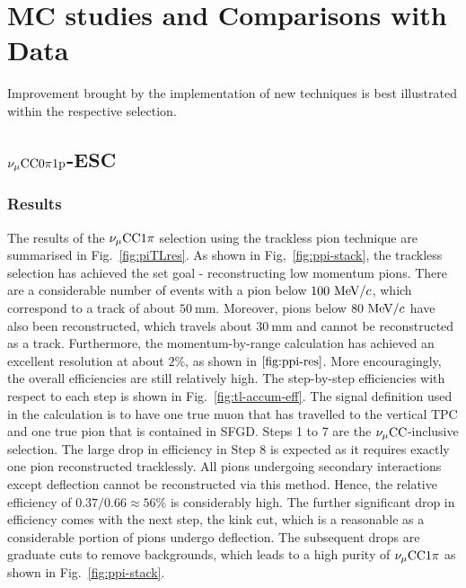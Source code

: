 \section{MC studies and Comparisons with Data}
     Improvement brought by the implementation of new techniques is best illustrated within the respective selection.

     \subsection{$\nu_{\mu}\textrm{CC}0\pi1\textrm{p}$-ESC}
    
        \subsubsection{Results}
           The results of the $\nu_{\mu}\textrm{CC}1\pi$ selection using the trackless pion technique are summarised in Fig.~\ref{fig:piTLres}.
           As shown in Fig,~\ref{fig:ppi-stack}, the trackless selection has achieved the set goal - reconstructing low momentum pions. 
           There are a considerable number of events with a pion below $100~\textrm{MeV}/c$, which correspond to a track of about $50~\textrm{mm}$. 
           Moreover, pions below $80~\textrm{MeV}/c$ have also been reconstructed, which travels about $30~\textrm{mm}$ and cannot be reconstructed as a track. 
           Furthermore, the momentum-by-range calculation has achieved an excellent resolution at about $2\%$, as shown in $\ref{fig:ppi-res}$.
           More encouragingly, the overall efficiencies are still relatively high. 
           The step-by-step efficiencies with respect to each step is shown in Fig.~\ref{fig:tl-accum-eff}. 
           The signal definition used in the calculation is to have one true muon that has travelled to the vertical TPC and one true pion that is contained in SFGD. 
           Steps 1 to 7 are the $\nu_{\mu}\textrm{CC}$-inclusive selection. 
           The large drop in efficiency in Step 8 is expected as it requires exactly one pion reconstructed tracklessly. 
           All pions undergoing secondary interactions except deflection cannot be reconstructed via this method. 
           Hence, the relative efficiency of $0.37/0.66\approx56\%$ is considerably high. 
           The further significant drop in efficiency comes with the next step, the kink cut, which is a reasonable as a considerable portion of pions undergo deflection. 
           The subsequent drops are graduate cuts to remove backgrounds, which leads to a high purity of $\nu_{\mu}\textrm{CC}1\pi$ as shown in Fig.~\ref{fig:ppi-stack}.

